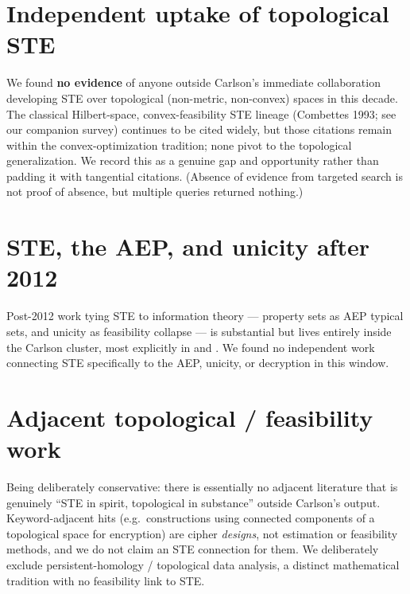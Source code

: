 \documentclass[11pt]{article}
\begin{document}
\section{Independent uptake of topological STE}
We found \textbf{no evidence} of anyone outside Carlson's immediate
collaboration developing STE over topological (non-metric, non-convex)
spaces in this decade.  The classical Hilbert-space, convex-feasibility
STE lineage (Combettes 1993; see our companion survey) continues to be
cited widely, but those citations remain within the convex-optimization
tradition; none pivot to the topological generalization.  We record this
as a genuine gap and opportunity rather than padding it with tangential
citations.  (Absence of evidence from targeted search is not proof of
absence, but multiple queries returned nothing.)

\section{STE, the AEP, and unicity after 2012}
Post-2012 work tying STE to information theory --- property sets as AEP
typical sets, and unicity as feasibility collapse --- is substantial but
lives entirely inside the Carlson cluster, most explicitly in
\citet{carlson2022localentropy} and \citet{carlson2026entropy}.  We found
no independent work connecting STE specifically to the AEP, unicity, or
decryption in this window.

\section{Adjacent topological / feasibility work}
Being deliberately conservative: there is essentially no adjacent
literature that is genuinely ``STE in spirit, topological in substance''
outside Carlson's output.  Keyword-adjacent hits (e.g.\ constructions
using connected components of a topological space for encryption) are
cipher \emph{designs}, not estimation or feasibility methods, and we do
not claim an STE connection for them.  We deliberately exclude
persistent-homology / topological data analysis, a distinct mathematical
tradition with no feasibility link to STE.
\end{document}
